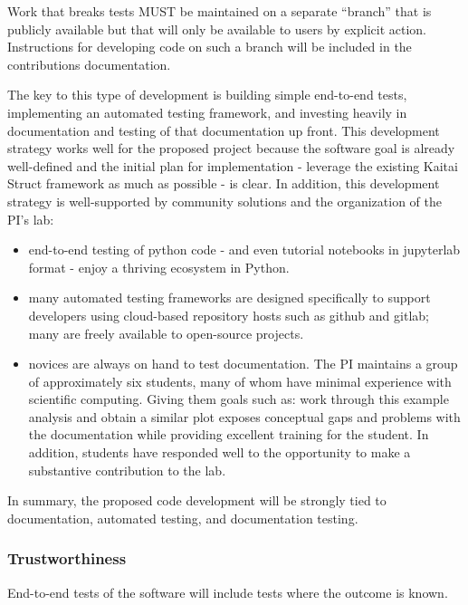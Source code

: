 Work that breaks tests MUST be maintained on a separate ``branch'' that is publicly available but that will only be available to users by explicit action.  Instructions for developing code on such a branch will be included in the contributions documentation.

The key to this type of development is building simple end-to-end tests, implementing an automated testing framework, and investing heavily in documentation and testing of that documentation up front.  This development strategy works well for the proposed project because the software goal is already well-defined and the initial plan for implementation - leverage the existing Kaitai Struct framework as much as possible - is clear.  In addition, this development strategy is well-supported by community solutions and the organization of the PI's lab:

\begin{itemize}
    \item end-to-end testing of python code - and even tutorial notebooks in jupyterlab format - enjoy a thriving ecosystem in Python.
    \item many automated testing frameworks are designed specifically to support developers using cloud-based repository hosts such as github and gitlab; many are freely available to open-source projects.
    \item novices are always on hand to test documentation.  The PI maintains a group of approximately six students, many of whom have minimal experience with scientific computing.  Giving them goals such as: work through this example analysis and obtain a similar plot exposes conceptual gaps and problems with the documentation while providing excellent training for the student.  In addition, students have responded well to the opportunity to make a substantive contribution to the lab.
\end{itemize}

In summary, the proposed code development will be strongly tied to documentation, automated testing, and documentation testing.


\subsubsection*{Trustworthiness}
End-to-end tests of the software will include tests where the outcome is known.


